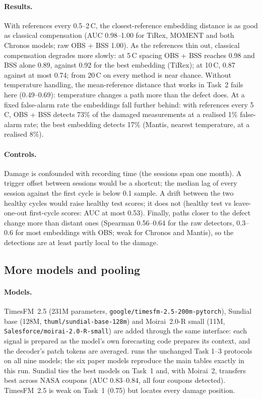 \documentclass{article}
\begin{document}
\paragraph{Results.} With references every 0.5--2\,\textdegree C, the closest-reference embedding
distance is as good as classical compensation (AUC 0.98--1.00 for TiRex, MOMENT and both Chronos
models; raw OBS + BSS 1.00). As the references thin out, classical compensation degrades more slowly: at
5\,\textdegree C spacing OBS + BSS reaches 0.98 and BSS alone 0.89, against 0.92 for the best embedding
(TiRex); at 10\,\textdegree C, 0.87 against at most 0.74; from 20\,\textdegree C on every method is near
chance. Without temperature handling, the mean-reference distance that works in Task~2 fails here
(0.49--0.69): temperature changes a path more than the defect does. At a fixed false-alarm rate the
embeddings fall further behind: with references every 5\,\textdegree C, OBS + BSS detects 73\% of the
damaged measurements at a realised 1\% false-alarm rate; the best embedding detects 17\% (Mantis, nearest
temperature, at a realised 8\%).

\paragraph{Controls.} Damage is confounded with recording time (the sessions span one month). A trigger
offset between sessions would be a shortcut; the median lag of every session against the first cycle is
below 0.1 sample. A drift between the two healthy cycles would raise healthy test scores; it does not
(healthy test vs leave-one-out first-cycle scores: AUC at most 0.53). Finally, paths closer to the defect
change more than distant ones (Spearman 0.56--0.64 for the raw detectors, 0.3--0.6 for most embeddings
with OBS; weak for Chronos and Mantis), so the detections are at least partly local to the damage.

\subsection{More models and pooling}
\label{app:ext:models}

\paragraph{Models.} TimesFM~2.5 (231M parameters, \texttt{google/timesfm-2.5-200m-pytorch}), Sundial base
(128M, \texttt{thuml/sundial-base-128m}) and Moirai~2.0-R small (11M, \texttt{Salesforce/moirai-2.0-R-small})
are added through the same interface: each signal is prepared as the model's own forecasting code
prepares its context, and the decoder's patch tokens are averaged.  runs the
unchanged Task 1--3 protocols on all nine models; the six paper models reproduce the main tables exactly in
this run. Sundial ties the best models on Task~1 and, with Moirai~2, transfers best across NASA coupons
(AUC 0.83--0.84, all four coupons detected). TimesFM~2.5 is weak on Task~1 (0.75) but locates every
damage position.
\end{document}
